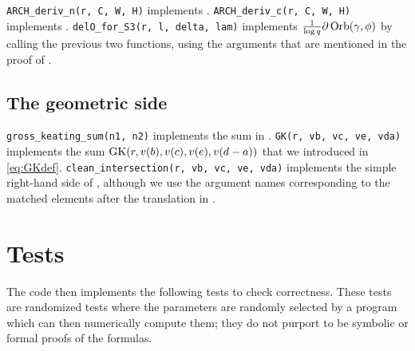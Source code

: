 \begin{itemize}
  \ii \texttt{ARCH\_deriv\_n(r, C, W, H)} implements .
  \ii \texttt{ARCH\_deriv\_c(r, C, W, H)} implements .
  \ii \texttt{delO\_for\_S3(r, l, delta, lam)} implements
  $\frac{1}{\log q}\partial\operatorname{Orb}(\gamma, \phi)$
  by calling the previous two functions,
  using the arguments that are mentioned in the proof of .
\end{itemize}

\subsection{The geometric side}
\begin{itemize}
  \ii \texttt{gross\_keating\_sum(n1, n2)} implements the sum in .
  \ii \texttt{GK(r, vb, vc, ve, vda)} implements the sum $\operatorname{GK}(r, v(b), v(c), v(e), v(d-a))$
  that we introduced in \eqref{eq:GKdef}.
  \ii \texttt{clean\_intersection(r, vb, vc, ve, vda)} implements the simple right-hand side of
  ,
  although we use the argument names corresponding to the matched elements
  after the translation in .
\end{itemize}

\section{Tests}
The code then implements the following tests to check correctness.
These tests are randomized tests where the parameters are randomly selected by a program
which can then numerically compute them;
they do not purport to be symbolic or formal proofs of the formulas.


